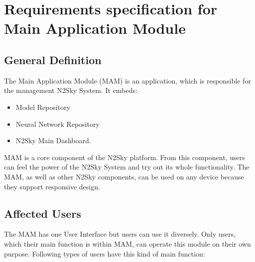 
\section{Requirements specification for Main Application Module}\label{Requirements specifications for Main Application Module}
\subsection{General Definition}\label{GeneralDefinition main}
The Main Application Module (MAM) is an application, which is responsible for the management N2Sky System. It embeds:
\begin{itemize}
\item Model Repository 
\item Neural Network Repository 
\item N2Sky Main Dashboard.
\end{itemize}

MAM is a core component of the N2Sky platform. From this component, users can feel the power of the N2Sky System and try out its whole functionality. The MAM, as well as other N2Sky components, can be used on any device because they support responsive design. 

\subsection{Affected Users}\label{Affected users MAM}
The MAM has one User Interface but users can use it diversely. Only users, which their main function is within MAM, can operate this module on their own purpose. Following types of users have this kind of main function:

